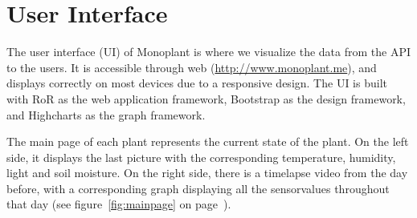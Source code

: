 









\section{User Interface}
The user interface (UI) of Monoplant is where we visualize the data from the API to the users. It is accessible through web (\url{http://www.monoplant.me}), and displays correctly on most devices due to a responsive design. The UI is built with RoR as the web application framework, Bootstrap as the design framework, and Highcharts as the graph framework.   

The main page of each plant represents the current state of the plant. On the left side, it displays the last picture with the corresponding temperature, humidity, light and soil moisture. On the right side, there is a timelapse video from the day before, with a corresponding graph displaying all the sensorvalues throughout that day (see figure~\ref{fig:mainpage} on page~\pageref{fig:mainpage}). 

